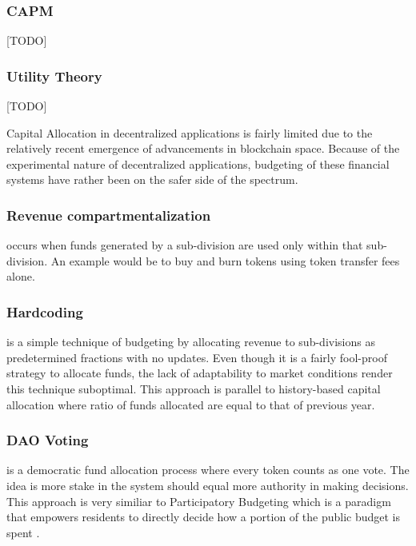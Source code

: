 \documentclass[conference,letterpaper]{IEEEtran}
\begin{document}
            \subsubsection{CAPM}
            [TODO]

            \subsubsection{Utility Theory}
            [TODO]

            Capital Allocation in decentralized applications is fairly limited due to the
            relatively recent emergence of advancements in blockchain space. Because of
            the experimental nature of decentralized applications, budgeting of these
            financial systems have rather been on the safer side of the spectrum.

            \subsubsection{Revenue compartmentalization} occurs when funds generated by a
            sub-division are used only within that sub-division. An example would be to
            buy and burn tokens using token transfer fees alone.

            \subsubsection{Hardcoding} is a simple technique of budgeting by allocating
            revenue to sub-divisions as predetermined fractions with no updates. Even
            though it is a fairly fool-proof strategy to allocate funds, the lack of
            adaptability to market conditions render this technique suboptimal. This
            approach is parallel to history-based capital allocation where ratio of funds
            allocated are equal to that of previous year.

            \subsubsection{DAO Voting} is a democratic fund allocation process where every
            token counts as one vote. The idea is more stake in the system should equal
            more authority in making decisions. This approach is very similiar to
            Participatory Budgeting which is a paradigm that empowers residents to
            directly decide how a portion of the public budget is spent
            \cite{aziz2021participatory}.
\end{document}
